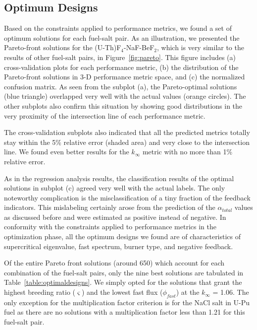 \subsection{Optimum Designs}

    Based on the constraints applied to performance metrics, we found a set of optimum solutions for each fuel-salt pair. As an illustration, we presented the Pareto-front solutions for the (U-Th)F$_4$-NaF-BeF$_2$, which is very similar to the results of other fuel-salt pairs, in Figure~\ref{fig:pareto}. This figure includes (a) cross-validation plots for each performance metric, (b) the distribution of the Pareto-front solutions in 3-D performance metric space, and (c) the normalized confusion matrix. As seen from the subplot (a), the Pareto-optimal solutions (blue triangle) overlapped very well with the actual values (orange circles). The other subplots also confirm this situation by showing good distributions in the very proximity of the intersection line of each performance metric.

    The cross-validation subplots also indicated that all the predicted metrics totally stay within the 5\% relative error (shaded area) and very close to the intersection line. We found even better results for the $k_{\infty}$ metric with no more than 1\% relative error.

    As in the regression analysis results, the classification results of the optimal solutions in subplot (c) agreed very well with the actual labels. The only noteworthy complication is the misclassification of a tiny fraction of the feedback indicators. This mislabeling certainly arose from the prediction of the ${\alpha_{total}}$ values as discussed before and were estimated as positive instead of negative. In conformity with the constraints applied to performance metrics in the optimization phase, all the optimum designs we found are of characteristics of supercritical eigenvalue, fast spectrum, burner type, and negative feedback.

    Of the entire Pareto front solutions (around 650) which account for each combination of the fuel-salt pairs, only the nine best solutions are tabulated in Table~\ref{table:optimaldesigns}. We simply opted for the solutions that grant the highest breeding ratio ($\varsigma$) and the lowest fast flux ($\phi_{fast}$) at the $k_{\infty}$ = 1.06. The only exception for the multiplication factor criterion is for the NaCl salt in U-Pu fuel as there are no solutions with a multiplication factor less than 1.21 for this fuel-salt pair.

